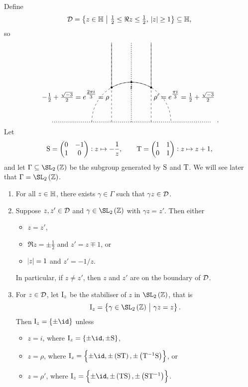 Define
$$ \DDD = \cbr{z \in \HH \st \tfrac{1}{2} \le \Re z \le \tfrac{1}{2}, \ \abs{z} \ge 1} \subseteq \HH, $$
so
$$
\begin{tikzpicture}[scale=2]
\draw [dotted, thick] (-2, 0) to (2, 0);
\draw [dotted, thick] (0, 0) to (0, 2);
\draw [dashed] (-1, 0) arc (180:0:1);
\draw [dashed] (-0.5, 0) to (-0.5, 2);
\draw [dashed] (0.5, 0) to (0.5, 2);
\draw (-0.5, 0.866) arc (120:60:1);
\draw (-0.5, 0.866) to (-0.5, 2);
\draw (0.5, 0.866) to (0.5, 2);
\fill (0, 1) circle (0.025) node[below]{$ i $};
\fill (-0.5, 0.866) circle (0.025) node[below left]{$ -\tfrac{1}{2} + \tfrac{\sqrt{-3}}{2} = e^{\tfrac{2\pi i}{3}} = \rho $};
\fill (0.5, 0.866) circle (0.025) node[below right]{$ \rho' = e^{\tfrac{\pi i}{3}} = \tfrac{1}{2} + \tfrac{\sqrt{-3}}{2} $};
\end{tikzpicture}.
$$
Let
$$ \S = \twobytwo{0}{-1}{1}{0} : z \mapsto -\dfrac{1}{z}, \qquad \T = \twobytwo{1}{1}{0}{1} : z \mapsto z + 1, $$
and let $ \Gamma \subseteq \SL_2\br{\ZZ} $ be the subgroup generated by $ \S $ and $ \T $. We will see later that $ \Gamma = \SL_2\br{\ZZ} $.

\begin{theorem}
\label{thm:fundamentaldomain}
\hfill
\begin{enumerate}
\item For all $ z \in \HH $, there exists $ \gamma \in \Gamma $ such that $ \gamma z \in \DDD $.
\item Suppose $ z, z' \in \DDD $ and $ \gamma \in \SL_2\br{\ZZ} $ with $ \gamma z = z' $. Then either
\begin{itemize}
\item $ z = z' $,
\item $ \Re z = \pm\tfrac{1}{2} $ and $ z' = z \mp 1 $, or
\item $ \abs{z} = 1 $ and $ z' = -1 / z $.
\end{itemize}
In particular, if $ z \ne z' $, then $ z $ and $ z' $ are on the boundary of $ \DDD $.
\item For $ z \in \DDD $, let $ \I_z $ be the stabiliser of $ z $ in $ \SL_2\br{\ZZ} $, that is
$$ \I_z = \cbr{\gamma \in \SL_2\br{\ZZ} \st \gamma z = z}. $$
Then $ \I_z = \cbr{\pm\id} $ unless
\begin{itemize}
\item $ z = i $, where $ \I_z = \cbr{\pm\id, \pm \S} $,
\item $ z = \rho $, where $ \I_z = \cbr{\pm\id, \pm\br{\S\T}, \pm\br{\T^{-1}\S}} $, or
\item $ z = \rho' $, where $ \I_z = \cbr{\pm\id, \pm\br{\T\S}, \pm\br{\S\T^{-1}}} $.
\end{itemize}
\end{enumerate}
\end{theorem}

